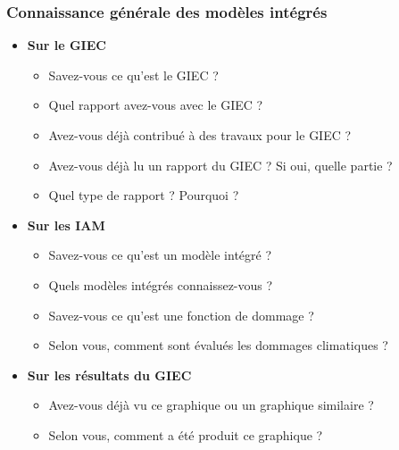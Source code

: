 \subsubsection*{Connaissance générale des modèles intégrés}
\begin{itemize}
    \item \textbf{Sur le GIEC}
    \begin{itemize}
        \item Savez-vous ce qu'est le GIEC ?
        \item Quel rapport avez-vous avec le GIEC ?
        \item Avez-vous déjà contribué à des travaux pour le GIEC ?
        \item Avez-vous déjà lu un rapport du GIEC ? Si oui, quelle partie ?
        \item Quel type de rapport ? Pourquoi ?
    \end{itemize}
    \item \textbf{Sur les IAM}
    \begin{itemize}
        \item Savez-vous ce qu'est un modèle intégré ?
        \item Quels modèles intégrés connaissez-vous ?
        \item Savez-vous ce qu'est une fonction de dommage ?
        \item Selon vous, comment sont évalués les dommages climatiques ?
    \end{itemize}
    \item \textbf{Sur les résultats du GIEC}
    \begin{itemize}
        \item Avez-vous déjà vu ce graphique ou un graphique similaire ?
        \item Selon vous, comment a été produit ce graphique ?
    \end{itemize}
\end{itemize}

